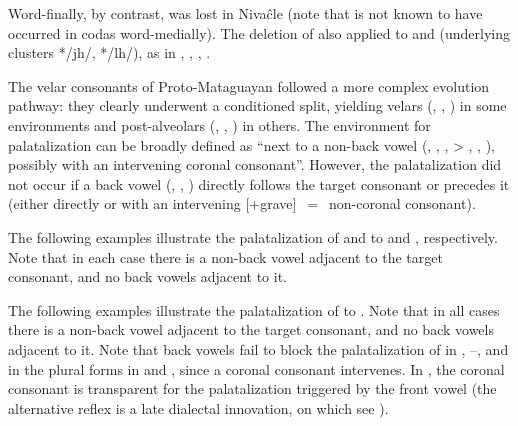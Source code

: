 Word-finally, by contrast,  was lost in Nivaĉle (note that  is not known to have occurred in codas word-medially). The deletion of  also applied to  and  (underlying clusters */jh/, */lh/), as in , , , .

\begin{exe}
    \ex \plaj \label{ni-yh-plaj}
    \ex \distal \label{ni-yh-distal}
    \ex \companion
    \ex \monkparakeet
    \ex \neighbor
    \ex \spouse
    \ex \snail
    \ex \goimp
    \ex \dog
    \ex \tapeti
    \ex \soul \label{ni-yh-soul}
    \ex \hornero
    \ex \recipient \label{ni-yh-recipient}
    \ex \moon
    \ex \waspaniti
    \ex \doveula
    \ex \lessergrison
\end{exe}

The velar consonants of Proto-Mataguayan followed a more complex evolution pathway: they clearly underwent a conditioned split, yielding velars (, , ) in some environments and post-alveolars (, , ) in others. The environment for palatalization can be broadly defined as ``next to a non-back vowel (, , ,  > , , ), possibly with an intervening coronal consonant''. However, the palatalization did not occur if a back vowel (, , ) directly follows the target consonant or precedes it (either directly or with an intervening [+grave]~$=$~non-coronal consonant).

The following examples illustrate the palatalization of  and  to  and , respectively. Note that in each case there is a non-back vowel adjacent to the target consonant, and no back vowels adjacent to it. 

\begin{exe}
    \ex \honeycomb
    \ex \mortar
    \ex \hidev
    \ex \north
    \ex \tooln
    \ex \takeaway
    \ex \monkparakeet
    \ex \redquebracho
    \ex \sendv
    \ex \neighbor
    \ex \elderbro
    \ex \eldersis
    \ex \thread
    \ex \mesh
    \ex \plate
    \ex \allrcpr
    \ex \headn
    \ex \wildhoney
    \ex \queenpalmf
\end{exe}

The following examples illustrate the palatalization of  to . Note that in all cases there is a non-back vowel adjacent to the target consonant, and no back vowels adjacent to it. Note that back vowels fail to block the palatalization of  in , --, and in the plural forms in  and , since a coronal consonant intervenes. In , the coronal consonant  is transparent for the palatalization triggered by the front vowel  (the alternative reflex  is a late dialectal innovation, on which see ).


